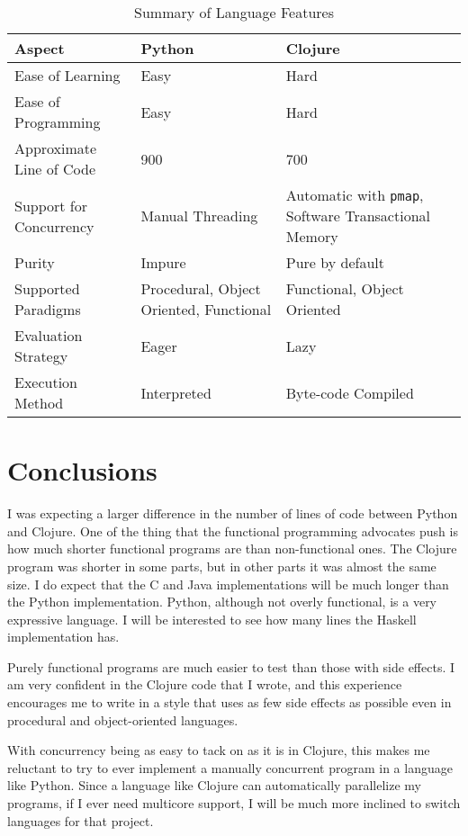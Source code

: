 \documentclass{article}
\begin{document}
\begin{table}[h]
    \caption{Summary of Language Features}
    \begin{tabular}{|p{1.6in}|p{1.6in}|p{1.6in}|}
        \hline
        Aspect & Python & Clojure \\
        \hline
        Ease of Learning    & Easy & Hard \\
        \hline
        Ease of Programming & Easy & Hard \\
        \hline
        Approximate Line of Code & 900 & 700 \\
        \hline
        Support for Concurrency & Manual Threading & Automatic with \texttt{pmap}, Software Transactional Memory \\
        \hline
        Purity              & Impure & Pure by default \\
        \hline
        Supported Paradigms & Procedural, Object Oriented, Functional & Functional, Object Oriented \\
        \hline
        Evaluation Strategy & Eager & Lazy \\
        \hline
        Execution Method    & Interpreted & Byte-code Compiled \\
        \hline
    \end{tabular}
\end{table}

\section{Conclusions}

I was expecting a larger difference in the number of lines of code between
Python and Clojure.  One of the thing that the functional programming advocates
push is how much shorter functional programs are than non-functional ones.  The
Clojure program was shorter in some parts, but in other parts it was almost the
same size.  I do expect that the C and Java implementations will be much longer
than the Python implementation.  Python, although not overly functional, is a very
expressive language.  I will be interested to see how many lines the Haskell
implementation has.

Purely functional programs are much easier to test than those with side effects.
I am very confident in the Clojure code that I wrote, and this experience
encourages me to write in a style that uses as few side effects as possible
even in procedural and object-oriented languages.

With concurrency being as easy to tack on as it is in Clojure, this makes me
reluctant to try to ever implement a manually concurrent program in a language
like Python.  Since a language like Clojure can automatically parallelize my
programs, if I ever need multicore support, I will be much more inclined to
switch languages for that project.
\end{document}
